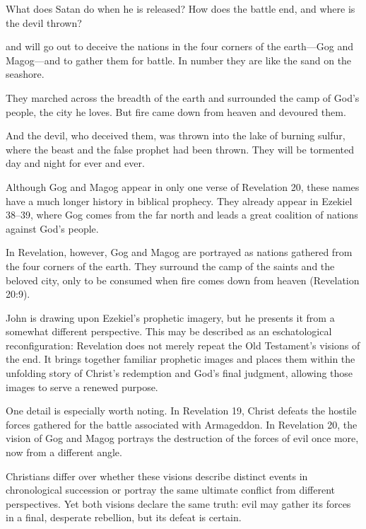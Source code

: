 \begin{ScriptureBox2}{What does Satan do when he is released? How does the battle end, and where is the devil thrown?}

\item[20:8] and will go out to deceive the nations in the four corners of the earth---Gog and Magog---and to gather them for battle. In number they are like the sand on the seashore.

\item[20:9] They marched across the breadth of the earth and surrounded the camp of God's people, the city he loves. But fire came down from heaven and devoured them.

\item[20:10] And the devil, who deceived them, was thrown into the lake of burning sulfur, where the beast and the false prophet had been thrown. They will be tormented day and night for ever and ever.

\end{ScriptureBox2}

Although Gog and Magog appear in only one verse of Revelation 20, these names have a much longer history in biblical prophecy. They already appear in Ezekiel 38--39, where Gog comes from the far north and leads a great coalition of nations against God's people.

In Revelation, however, Gog and Magog are portrayed as nations gathered from the four corners of the earth. They surround the camp of the saints and the beloved city, only to be consumed when fire comes down from heaven (Revelation 20:9).

John is drawing upon Ezekiel's prophetic imagery, but he presents it from a somewhat different perspective. This may be described as an eschatological reconfiguration: Revelation does not merely repeat the Old Testament's visions of the end. It brings together familiar prophetic images and places them within the unfolding story of Christ's redemption and God's final judgment, allowing those images to serve a renewed purpose.

One detail is especially worth noting. In Revelation 19, Christ defeats the hostile forces gathered for the battle associated with Armageddon. In Revelation 20, the vision of Gog and Magog portrays the destruction of the forces of evil once more, now from a different angle.

Christians differ over whether these visions describe distinct events in chronological succession or portray the same ultimate conflict from different perspectives. Yet both visions declare the same truth: evil may gather its forces in a final, desperate rebellion, but its defeat is certain.

